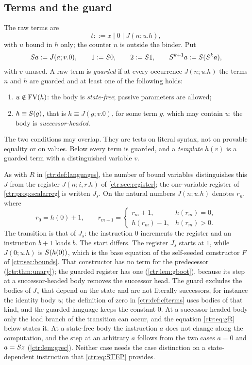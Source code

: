 \subsection{Terms and the guard}

\begin{definition}\label{ctr:def:gterms}
The raw terms are
\[
 t ::= x\mid 0\mid J(n;u.h),
\]
with $u$ bound in $h$ only; the counter $n$ is outside the binder. Put
\[
 S a\mathrel{:=} J(a;v.0),\qquad 1\mathrel{:=}S 0,\qquad 2\mathrel{:=}S 1,\qquad
 S^{k+1}a\mathrel{:=}S(S^k a),
\]
with $v$ unused. A raw term is \emph{guarded} if at every occurrence $J(n;u.h)$ the terms
$n$ and $h$ are guarded and at least one of the following holds:
\begin{enumerate}
\item $u\notin\operatorname{FV}(h)$: the body is \emph{state-free}; passive parameters are allowed;
\item $h\equiv S(g)$, that is $h\equiv J(g;v.0)$, for some term $g$, which may contain $u$:
the body is \emph{successor-headed}.
\end{enumerate}
The two conditions may overlap. They are tests on literal syntax, not on provable equality
or on values. Below every term is guarded, and a \emph{template} $h(v)$ is a guarded term
with a distinguished variable $v$.
\end{definition}

As with $R$ in \cref{ctr:def:languages}, the number of bound variables distinguishes this
$J$ from the register $J(n;i,r.h)$ of \cref{ctr:sec:register}; the one-variable register of
\cref{ctr:prop:scalarreg} is written $J_s$. On the natural numbers $J(n;u.h)$ denotes $r_n$,
where
\[
 r_0=h(0)+1,\qquad r_{m+1}=\begin{cases} r_m+1, & h(r_m)=0,\\ h(r_m)-1, & h(r_m)>0.\end{cases}
\]
The transition is that of $J_s$: the instruction $0$ increments the register and an
instruction $b+1$ loads $b$. The start differs. The register $J_s$ starts at $1$, while
$J(0;u.h)$ is $S(h(0))$, which is the base equation of the self-seeded constructor $F$
of \cref{ctr:sec:bounds}. That constructor has no term for the predecessor
(\cref{ctr:thm:unary}); the guarded register has one (\cref{ctr:lem:gboot}), because its step
at a successor-headed body removes the successor head. The guard excludes the bodies of
$J_s$ that depend on the state and are not literally successors, for instance the
identity body $u$; the definition of zero in \cref{ctr:def:cfterms} uses bodies of that
kind, and the guarded language keeps the constant $0$. At a successor-headed body only the
load branch of the transition can occur, and the equation \eqref{ctr:eq:gR} below states
it. At a state-free body the instruction $a$ does not change along the computation, and the
step at an arbitrary $a$ follows from the two cases $a=0$ and $a=S z$
(\cref{ctr:lem:grec}). Neither case needs the case distinction on a state-dependent
instruction that \eqref{ctr:eq:STEP} provides.

